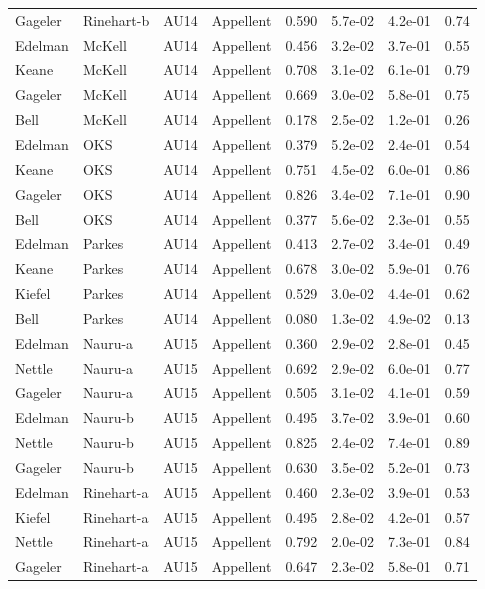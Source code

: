 \documentclass{monashthesis}
\begin{document}
\begin{center}
\begin{longtable}{llllllll}
Gageler & Rinehart-b & AU14 & Appellent & 0.590 & 5.7e-02 & 4.2e-01 & 0.74 \\
Edelman & McKell & AU14 & Appellent & 0.456 & 3.2e-02 & 3.7e-01 & 0.55 \\
Keane & McKell & AU14 & Appellent & 0.708 & 3.1e-02 & 6.1e-01 & 0.79 \\
Gageler & McKell & AU14 & Appellent & 0.669 & 3.0e-02 & 5.8e-01 & 0.75 \\
Bell & McKell & AU14 & Appellent & 0.178 & 2.5e-02 & 1.2e-01 & 0.26 \\
Edelman & OKS & AU14 & Appellent & 0.379 & 5.2e-02 & 2.4e-01 & 0.54 \\
Keane & OKS & AU14 & Appellent & 0.751 & 4.5e-02 & 6.0e-01 & 0.86 \\
Gageler & OKS & AU14 & Appellent & 0.826 & 3.4e-02 & 7.1e-01 & 0.90 \\
Bell & OKS & AU14 & Appellent & 0.377 & 5.6e-02 & 2.3e-01 & 0.55 \\
Edelman & Parkes & AU14 & Appellent & 0.413 & 2.7e-02 & 3.4e-01 & 0.49 \\
Keane & Parkes & AU14 & Appellent & 0.678 & 3.0e-02 & 5.9e-01 & 0.76 \\
Kiefel & Parkes & AU14 & Appellent & 0.529 & 3.0e-02 & 4.4e-01 & 0.62 \\
Bell & Parkes & AU14 & Appellent & 0.080 & 1.3e-02 & 4.9e-02 & 0.13 \\
Edelman & Nauru-a & AU15 & Appellent & 0.360 & 2.9e-02 & 2.8e-01 & 0.45 \\
Nettle & Nauru-a & AU15 & Appellent & 0.692 & 2.9e-02 & 6.0e-01 & 0.77 \\
Gageler & Nauru-a & AU15 & Appellent & 0.505 & 3.1e-02 & 4.1e-01 & 0.59 \\
Edelman & Nauru-b & AU15 & Appellent & 0.495 & 3.7e-02 & 3.9e-01 & 0.60 \\
Nettle & Nauru-b & AU15 & Appellent & 0.825 & 2.4e-02 & 7.4e-01 & 0.89 \\
Gageler & Nauru-b & AU15 & Appellent & 0.630 & 3.5e-02 & 5.2e-01 & 0.73 \\
Edelman & Rinehart-a & AU15 & Appellent & 0.460 & 2.3e-02 & 3.9e-01 & 0.53 \\
Kiefel & Rinehart-a & AU15 & Appellent & 0.495 & 2.8e-02 & 4.2e-01 & 0.57 \\
Nettle & Rinehart-a & AU15 & Appellent & 0.792 & 2.0e-02 & 7.3e-01 & 0.84 \\
Gageler & Rinehart-a & AU15 & Appellent & 0.647 & 2.3e-02 & 5.8e-01 & 0.71 \\

\end{longtable}
\end{center}
\end{document}
